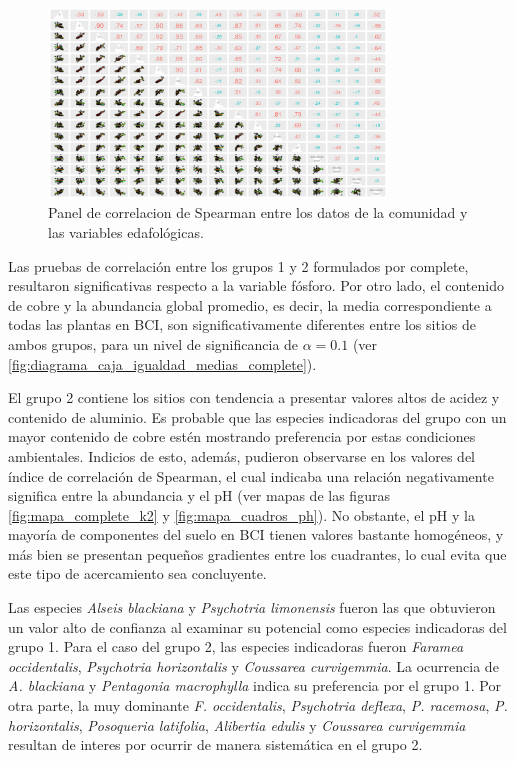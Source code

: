 \documentclass[11pt,]{article}
\begin{document}
\begin{figure}
\centering
\includegraphics[width=0.80000\textwidth]{panel_cor_suelo_abun_riq_rubic_spear.png}
\caption{Panel de correlacion de Spearman entre los datos de la
comunidad y las variables edafológicas.
\label{fig:panel_cor_suelo_abun_riq_rubic_spear}}
\end{figure}

Las pruebas de correlación entre los grupos 1 y 2 formulados por
complete, resultaron significativas respecto a la variable fósforo. Por
otro lado, el contenido de cobre y la abundancia global promedio, es
decir, la media correspondiente a todas las plantas en BCI, son
significativamente diferentes entre los sitios de ambos grupos, para un
nivel de significancia de \(\alpha= 0.1\) (ver
\ref{fig:diagrama_caja_igualdad_medias_complete}).

El grupo 2 contiene los sitios con tendencia a presentar valores altos
de acidez y contenido de aluminio. Es probable que las especies
indicadoras del grupo con un mayor contenido de cobre estén mostrando
preferencia por estas condiciones ambientales. Indicios de esto, además,
pudieron observarse en los valores del índice de correlación de
Spearman, el cual indicaba una relación negativamente significa entre la
abundancia y el pH (ver mapas de las figuras \ref{fig:mapa_complete_k2}
y \ref{fig:mapa_cuadros_ph}). No obstante, el pH y la mayoría de
componentes del suelo en BCI tienen valores bastante homogéneos, y más
bien se presentan pequeños gradientes entre los cuadrantes, lo cual
evita que este tipo de acercamiento sea concluyente.

Las especies \emph{Alseis blackiana} y \emph{Psychotria limonensis}
fueron las que obtuvieron un valor alto de confianza al examinar su
potencial como especies indicadoras del grupo 1. Para el caso del grupo
2, las especies indicadoras fueron \emph{Faramea occidentalis},
\emph{Psychotria horizontalis} y \emph{Coussarea curvigemmia}. La
ocurrencia de \emph{A. blackiana} y \emph{Pentagonia macrophylla} indica
su preferencia por el grupo 1. Por otra parte, la muy dominante \emph{F.
occidentalis}, \emph{Psychotria deflexa}, \emph{P. racemosa}, \emph{P.
horizontalis}, \emph{Posoqueria latifolia}, \emph{Alibertia edulis} y
\emph{Coussarea curvigemmia} resultan de interes por ocurrir de manera
sistemática en el grupo 2.
\end{document}
